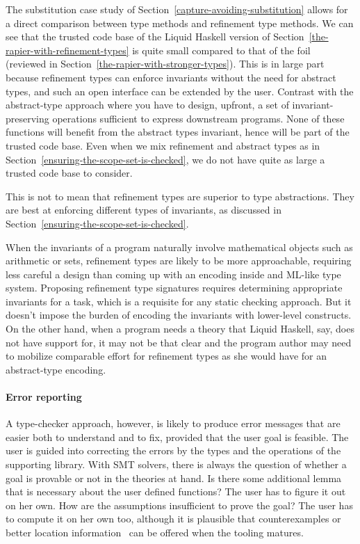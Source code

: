 \documentclass[sigconf]{acmart}
\begin{document}
The substitution case study of Section~\ref{capture-avoiding-substitution}
allows for a direct comparison between type methods and refinement type methods. We
can see that the trusted code base of the Liquid Haskell version of
Section~\ref{the-rapier-with-refinement-types} is quite small compared to that
of the foil~\cite{maclaurin23} (reviewed in
Section~\ref{the-rapier-with-stronger-types}). This is in large part
because refinement types can enforce invariants without the need for
abstract types, and such an open interface can be extended by the user.
Contrast with the abstract-type approach where you have to design, upfront, a
set of invariant-preserving operations sufficient to express downstream programs.
None of these functions will benefit from the abstract types invariant, hence
will be part of the trusted code base. Even when we mix refinement and abstract
types as in Section~\ref{ensuring-the-scope-set-is-checked}, we do not have quite
as large a trusted code base to consider.

This is not to mean that refinement types are superior to type abstractions.
They are best at enforcing different types of invariants, as discussed in
Section~\ref{ensuring-the-scope-set-is-checked}.

When the invariants of a program naturally involve mathematical objects such as
arithmetic or sets, refinement types are likely to be more approachable,
requiring less careful a design than coming up with an encoding inside and
ML-like type system. Proposing refinement type signatures requires
determining appropriate invariants for a task, which is a requisite for any static
checking approach. But it doesn't impose the burden of encoding the invariants with lower-level
constructs. On the other hand, when a program needs a theory that Liquid
Haskell, say, does not have support for, it may not be that clear and the program
author may need to mobilize comparable effort for refinement types as she would
have for an abstract-type encoding.

\paragraph{Error reporting} A type-checker approach, however, is likely to produce error messages that
are easier both to understand and to fix, provided that the user goal is feasible.
The user is guided into correcting the errors
by the types and the operations of the supporting library. With SMT solvers,
there is always the question of whether a goal is provable or not in the
theories at hand. Is there some additional lemma that is necessary about the user defined
functions? The user has to figure it out on her own. How are the assumptions
insufficient to prove the goal? The user has to compute it on her own too,
although it is plausible that counterexamples or better location information~\cite{webbers24}
can be offered when the tooling matures.
\end{document}
